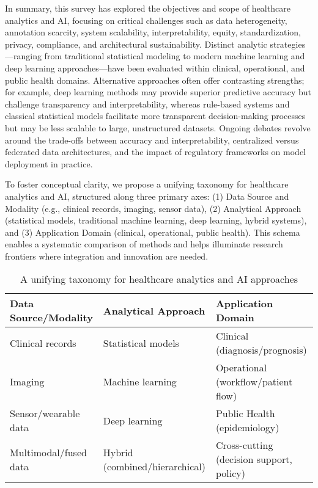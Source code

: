 \documentclass[sigconf]{acmart}
\begin{document}
In summary, this survey has explored the objectives and scope of healthcare analytics and AI, focusing on critical challenges such as data heterogeneity, annotation scarcity, system scalability, interpretability, equity, standardization, privacy, compliance, and architectural sustainability. Distinct analytic strategies—ranging from traditional statistical modeling to modern machine learning and deep learning approaches—have been evaluated within clinical, operational, and public health domains. Alternative approaches often offer contrasting strengths; for example, deep learning methods may provide superior predictive accuracy but challenge transparency and interpretability, whereas rule-based systems and classical statistical models facilitate more transparent decision-making processes but may be less scalable to large, unstructured datasets. Ongoing debates revolve around the trade-offs between accuracy and interpretability, centralized versus federated data architectures, and the impact of regulatory frameworks on model deployment in practice. 

To foster conceptual clarity, we propose a unifying taxonomy for healthcare analytics and AI, structured along three primary axes: (1) Data Source and Modality (e.g., clinical records, imaging, sensor data), (2) Analytical Approach (statistical models, traditional machine learning, deep learning, hybrid systems), and (3) Application Domain (clinical, operational, public health). This schema enables a systematic comparison of methods and helps illuminate research frontiers where integration and innovation are needed.

\begin{table*}[htbp]
\centering
\caption{A unifying taxonomy for healthcare analytics and AI approaches}
\label{tab:taxonomy}
\begin{adjustbox}{max width=\textwidth}
\begin{tabular}{@{}lll@{}}
\toprule
\textbf{Data Source/Modality} & \textbf{Analytical Approach}        & \textbf{Application Domain}           \\
\midrule
Clinical records              & Statistical models                 & Clinical (diagnosis/prognosis)        \\
Imaging                       & Machine learning                   & Operational (workflow/patient flow)   \\
Sensor/wearable data          & Deep learning                      & Public Health (epidemiology)          \\
Multimodal/fused data         & Hybrid (combined/hierarchical)     & Cross-cutting (decision support, policy) \\
\bottomrule
\end{tabular}
\end{adjustbox}
\end{table*}
\end{document}
